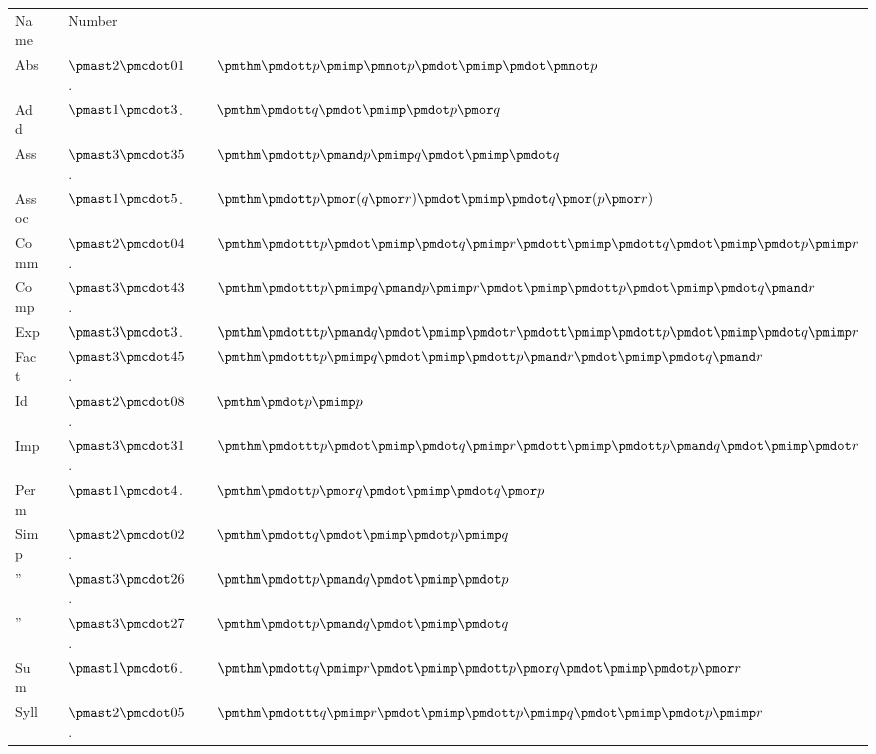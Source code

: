 \documentclass[letterpaper,12pt,openany,leqno]{book}
\begin{document}
\begin{center}
	\begin{tabular}{l l l l l}
			Name && Number && \\
			Abs && $\pmast2\pmcdot01$. && $\pmthm \pmdott p \pmimp \pmnot p \pmdot \pmimp \pmdot \pmnot p$ \\
			Add && $\pmast1\pmcdot3$. && $\pmthm \pmdott q \pmdot \pmimp \pmdot p \pmor q$ \\
			Ass && $\pmast3\pmcdot35$. && $\pmthm \pmdott p \pmand p \pmimp q \pmdot \pmimp \pmdot q$ \\
			Assoc && $\pmast1\pmcdot5$. && $\pmthm \pmdott p \pmor (q \pmor r) \pmdot \pmimp \pmdot q \pmor (p \pmor r)$ \\
			Comm && $\pmast2\pmcdot04$. && $\pmthm \pmdottt  p \pmdot \pmimp \pmdot q \pmimp r \pmdott \pmimp \pmdott q \pmdot \pmimp \pmdot p \pmimp r$ \\
			Comp && $\pmast3\pmcdot43$. && $\pmthm \pmdottt  p \pmimp q \pmand p \pmimp r \pmdot \pmimp \pmdott p \pmdot \pmimp \pmdot q \pmand r$ \\
			Exp && $\pmast3\pmcdot3$. && $\pmthm \pmdottt p \pmand q \pmdot \pmimp \pmdot r \pmdott \pmimp \pmdott p \pmdot \pmimp \pmdot q \pmimp r$ \\
			Fact && $\pmast3\pmcdot45$. && $\pmthm \pmdottt p \pmimp q \pmdot \pmimp \pmdott p \pmand r \pmdot \pmimp \pmdot q \pmand r $ \\
			Id && $\pmast2\pmcdot08$. && $\pmthm \pmdot p \pmimp p$ \\
			Imp && $\pmast3\pmcdot31$. && $\pmthm \pmdottt p \pmdot \pmimp \pmdot q \pmimp r \pmdott \pmimp \pmdott p \pmand q \pmdot \pmimp \pmdot r$ \\
			Perm && $\pmast1\pmcdot4$. && $\pmthm \pmdott p \pmor q \pmdot \pmimp \pmdot q \pmor p$ \\
			Simp && $\pmast2\pmcdot02$. && $\pmthm \pmdott q \pmdot \pmimp \pmdot p \pmimp q$ \\
			'' && $\pmast3\pmcdot26$. && $\pmthm \pmdott p \pmand q \pmdot \pmimp \pmdot p$ \\
			'' && $\pmast3\pmcdot27$. && $\pmthm \pmdott p \pmand q \pmdot \pmimp \pmdot q$ \\
			Sum && $\pmast1\pmcdot6$. && $\pmthm \pmdott q \pmimp r \pmdot \pmimp \pmdott p \pmor q \pmdot \pmimp \pmdot p \pmor r$ \\
			Syll && $\pmast2\pmcdot05$. && $\pmthm \pmdottt q \pmimp r \pmdot \pmimp \pmdott p \pmimp q \pmdot \pmimp \pmdot p \pmimp r$ \\

\end{tabular}
\end{center}
\end{document}
